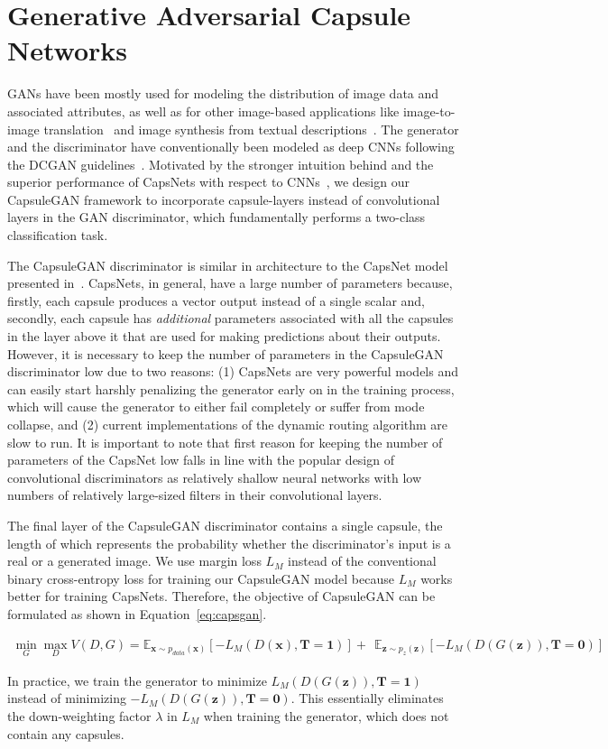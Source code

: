 \section{Generative Adversarial Capsule Networks}
\label{sec:capsgan}
GANs have been mostly used for modeling the distribution of image data and associated attributes, as well as for other image-based applications like image-to-image translation~\cite{bib:im2im_tr} and image synthesis from textual descriptions~\cite{bib:im_synth}. The generator and the discriminator have conventionally been modeled as deep CNNs following the DCGAN guidelines~\cite{bib:dcgan}. Motivated by the stronger intuition behind and the superior performance of CapsNets with respect to CNNs~\cite{bib:capsnet}, we design our CapsuleGAN framework to incorporate capsule-layers instead of convolutional layers in the GAN discriminator, which fundamentally performs a two-class classification task.

The CapsuleGAN discriminator is similar in architecture to the CapsNet model presented in~\cite{bib:capsnet}. 
CapsNets, in general, have a large number of parameters because, firstly, each capsule produces a vector output instead of a single scalar and, secondly, each capsule has \emph{additional} parameters associated with all the capsules in the layer above it that are used for making predictions about their outputs. However, it is necessary to keep the number of parameters in the CapsuleGAN discriminator low due to two reasons: (1) CapsNets are very powerful models and can easily start harshly penalizing the generator  early on in the training process, which will cause the generator to either fail completely or suffer from mode collapse, and (2) current implementations of the dynamic routing algorithm are slow to run. It is important to note that first reason for keeping the number of parameters of the CapsNet low falls in line with the popular design of convolutional discriminators as relatively shallow neural networks with low numbers of relatively large-sized filters in their convolutional layers.

The final layer of the CapsuleGAN discriminator contains a single capsule, the length of which represents the probability whether the discriminator's input is a real or a generated image. We use  margin loss $L_M$ instead of the conventional binary cross-entropy loss for training our CapsuleGAN model because $L_M$ works better for training CapsNets. Therefore, the objective of CapsuleGAN can be formulated as shown in Equation~\ref{eq:capsgan}.

\begin{align}
\min_{G} \max_{D} V(D, G) = \mathbb{E}_{\mathbf{x} \sim p_{data}(\mathbf{x})} \left [ -L_M(D(\mathbf{x}), \mathbf{T}=\mathbf{1}) \right ] + \ \ \mathbb{E}_{\mathbf{z} \sim p_{z}(\mathbf{z})} \left [ -L_M(D(G(\mathbf{z})), \mathbf{T}=\mathbf{0}) \right ]
\label{eq:capsgan}
\end{align}

In practice, we train the generator to minimize $L_M(D(G(\mathbf{z})), \mathbf{T=1})$ instead of minimizing $-L_M(D(G(\mathbf{z})), \mathbf{T}=\mathbf{0})$. This essentially eliminates the down-weighting factor $\lambda$ in $L_M$ when training the generator, which does not contain any capsules.